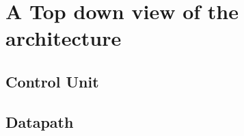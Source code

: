 \chapter{A Top down view of the architecture}
\label{architecure}

\section{Control Unit}

\section{Datapath}